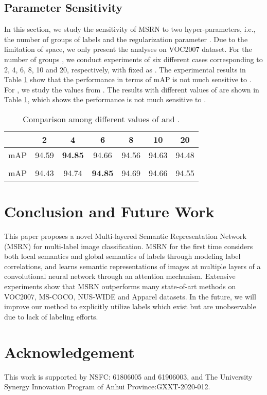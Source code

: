 \documentclass{article} \usepackage{nips14submit_e,times}
\begin{document}
\subsection{Parameter Sensitivity}
In this section, we study the sensitivity of MSRN to two hyper-parameters, i.e., the number of groups of labels  and the regularization parameter . Due to the limitation of space, we only present the analyses on VOC2007 dataset.
For the number of groups , we conduct experiments of six different cases corresponding to 2, 4, 6, 8, 10 and 20, respectively, with  fixed as .
The experimental results in Table \ref{table:groups} show that the performance in terms of mAP is not much sensitive to . For , we study the values from . The results with different values of  are shown in Table \ref{table:groups}, which shows the performance is not much sensitive to .
\begin{table}[h]
\caption{Comparison among different values of  and .}
\label{table:groups}
\centering \small
\begin{tabular}{c |cccccc}
    \hline
     & 2 & 4 & 6 &8 & 10 & 20 \\ \hline
    mAP & 94.59 & \textbf{94.85} & 94.66 & 94.56 & 94.63 & 94.48 \\
\hline\hline
     & & & & & & \\
    \hline
    mAP & 94.43 & 94.74 & \textbf{94.85} & 94.69 & 94.66 & 94.55 \\\hline
    \end{tabular}
\end{table}


\section{Conclusion and Future Work}
\label{sec:conclusion}
This paper proposes a novel Multi-layered Semantic Representation Network (MSRN) for multi-label image classification. MSRN for the first time considers both local semantics and global semantics of labels through modeling label correlations, and learns semantic representations of images at multiple layers of a convolutional neural network through an attention mechanism.
Extensive experiments show that MSRN outperforms many state-of-art
methods on VOC2007, MS-COCO, NUS-WIDE and Apparel datasets.
In the future, we will improve our method to explicitly utilize labels which exist but are unobservable due to lack of labeling efforts.



\section*{Acknowledgement}
This work is supported by NSFC: 61806005 and 61906003, and The University Synergy Innovation Program of Anhui Province:GXXT-2020-012.



\end{document}
